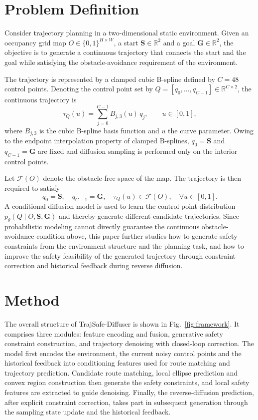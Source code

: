 \documentclass[journal]{IEEEtran}
\newcommand{\R}{\mathbb{R}}
\begin{document}
\section{Problem Definition}

Consider trajectory planning in a two-dimensional static environment. Given an
occupancy grid map $O\in\{0,1\}^{H\times W}$, a start $\bm S\in\R^2$ and a
goal $\bm G\in\R^2$, the objective is to generate a continuous trajectory that
connects the start and the goal while satisfying the obstacle-avoidance
requirement of the environment.

The trajectory is represented by a clamped cubic B-spline defined by
$C=48$ control points. Denoting the control point set by
$Q=[q_0,\ldots,q_{C-1}]\in\R^{C\times2}$, the continuous trajectory is
\begin{equation}
\tau_Q(u)=\sum_{j=0}^{C-1}B_{j,3}(u)\,q_j,\qquad u\in[0,1],
\end{equation}
where $B_{j,3}$ is the cubic B-spline basis function and $u$ the curve
parameter. Owing to the endpoint interpolation property of clamped B-splines,
$q_0=\bm S$ and $q_{C-1}=\bm G$ are fixed and diffusion sampling is performed
only on the interior control points.

Let $\mathcal F(O)$ denote the obstacle-free space of the map. The trajectory
is then required to satisfy
\begin{equation}
q_0=\bm S,\quad q_{C-1}=\bm G,\quad
\tau_Q(u)\in\mathcal F(O),\quad \forall u\in[0,1].
\end{equation}
A conditional diffusion model is used to learn the control point distribution
$p_\theta(Q\mid O,\bm S,\bm G)$ and thereby generate different candidate
trajectories. Since probabilistic modeling cannot directly guarantee the
continuous obstacle-avoidance condition above, this paper further studies how
to generate safety constraints from the environment structure and the planning
task, and how to improve the safety feasibility of the generated trajectory
through constraint correction and historical feedback during reverse diffusion.

\section{Method}

The overall structure of TrajSafe-Diffuser is shown in Fig.~\ref{fig:framework}.
It comprises three modules: feature encoding and fusion, generative safety
constraint construction, and trajectory denoising with closed-loop correction.
The model first encodes the environment, the current noisy control points and
the historical feedback into conditioning features used for route matching and
trajectory prediction. Candidate route matching, local ellipse prediction and
convex region construction then generate the safety constraints, and local
safety features are extracted to guide denoising. Finally, the
reverse-diffusion prediction, after explicit constraint correction, takes part
in subsequent generation through the sampling state update and the historical
feedback.
\end{document}
